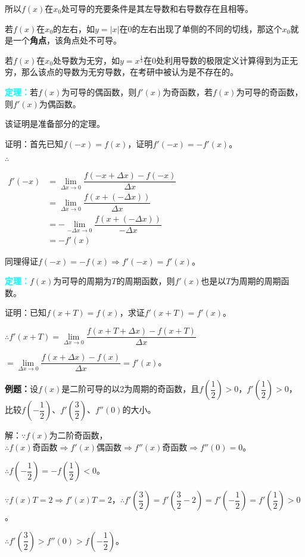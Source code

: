 \documentclass[UTF8, 12pt]{ctexart}
\begin{document}
所以$f(x)$在$x_0$处可导的充要条件是其左导数和右导数存在且相等。

若$f(x)$在$x_0$的左右，如$y=\vert x\vert$在$0$的左右出现了单侧的不同的切线，那这个$x_0$就是一个\textbf{角点}，该角点处不可导。

若$f(x)$在$x_0$处导数为无穷，如$y=x^{\frac{1}{3}}$在$0$处利用导数的极限定义计算得到为正无穷，那么该点的导数为无穷导数，在考研中被认为是不存在的。

\textcolor{aqua}{\textbf{定理：}}若$f(x)$为可导的偶函数，则$f'(x)$为奇函数，若$f(x)$为可导的奇函数，则$f'(x)$为偶函数。

该证明是准备部分的定理。

证明：首先已知$f(-x)=f(x)$，证明$f'(-x)=-f'(x)$。

$\therefore$

$
\begin{aligned}
    f'(-x) &=\lim\limits_{\Delta x\to 0}\dfrac{f(-x+\Delta x)-f(-x)}{\Delta x} \\
    & =\lim\limits_{\Delta x\to 0}\dfrac{f(x+(-\Delta x))}{\Delta x} \\
    & =-\lim\limits_{-\Delta x\to 0}\dfrac{f(x+(-\Delta x))}{-\Delta x} \\
    & =-f'(x)
\end{aligned}
$

同理得证$f(-x)=-f(x)\Rightarrow f'(-x)=f'(x)$。

\textcolor{aqua}{\textbf{定理：}}$f(x)$为可导的周期为$T$的周期函数，则$f'(x)$也是以$T$为周期的周期函数。

证明：已知$f(x+T)=f(x)$，求证$f'(x+T)=f'(x)$。\medskip

$\therefore f'(x+T)=\lim\limits_{\Delta x\to 0}\dfrac{f(x+T+\Delta x)-f(x+T)}{\Delta x}$

$=\lim\limits_{\Delta x\to 0}\dfrac{f(x+\Delta x)-f(x)}{\Delta x}=f'(x)$。

\textbf{例题：}设$f(x)$是二阶可导的以2为周期的奇函数，且$f(\dfrac{1}{2})>0$，$f'(\dfrac{1}{2})>0$，比较$f(-\dfrac{1}{2})$、$f'(\dfrac{3}{2})$、$f''(0)$的大小。\medskip

解：$\because f(x)$为二阶奇函数，$\therefore f(x)\text{奇函数}\Rightarrow f'(x)\text{偶函数}\Rightarrow f''(x)\text{奇函数}\Rightarrow f''(0)=0$。

$\therefore f(-\dfrac{1}{2})=-f(\dfrac{1}{2})<0$。

$\because f(x)T=2\Rightarrow f'(x)T=2$，$\therefore f'(\dfrac{3}{2})=f'(\dfrac{3}{2}-2)=f'(-\dfrac{1}{2})=f'(\dfrac{1}{2})>0$。

$\therefore f'(\dfrac{3}{2})>f''(0)>f(-\dfrac{1}{2})$。\medskip
\end{document}
